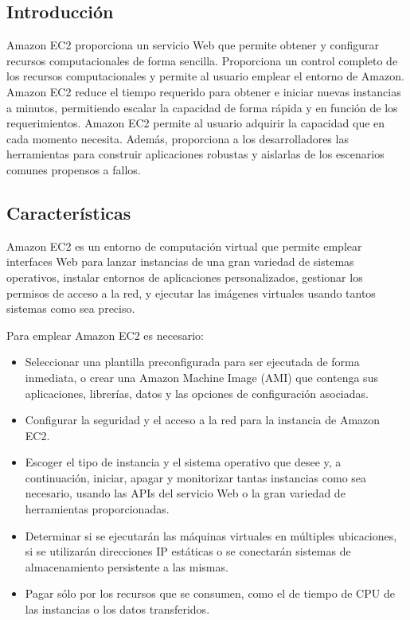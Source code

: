 \documentclass[runningheads]{llncs}
\begin{document}
\subsection{Introducción}

Amazon EC2 proporciona un servicio Web que permite obtener y configurar recursos computacionales de forma sencilla. Proporciona un 
control completo de los recursos computacionales y permite al usuario emplear el entorno de Amazon.
Amazon EC2 reduce el tiempo requerido para obtener e iniciar nuevas instancias a minutos, permitiendo escalar la capacidad de 
forma rápida y en función de los requerimientos. Amazon EC2 permite al usuario adquirir la capacidad que en cada momento necesita. 
Además, proporciona a los desarrolladores las herramientas para construir aplicaciones robustas y aislarlas de los escenarios comunes 
propensos a fallos.


\subsection{Características}

Amazon EC2 es un entorno de computación virtual que permite emplear interfaces Web para lanzar instancias de una gran variedad de 
sistemas operativos, instalar entornos de aplicaciones personalizados, gestionar los permisos de acceso a
la red, y ejecutar las imágenes virtuales usando tantos sistemas como sea preciso.

Para emplear Amazon EC2 es necesario:

\begin{itemize}
 \item Seleccionar una plantilla preconfigurada para ser ejecutada de forma inmediata, o crear una Amazon Machine Image (AMI) 
 que contenga sus aplicaciones, librerías, datos y las opciones de configuración asociadas.
 \item Configurar la seguridad y el acceso a la red para la instancia de Amazon EC2.
 \item Escoger el tipo de instancia y el sistema operativo que desee y, a continuación, iniciar, apagar y monitorizar tantas 
 instancias como sea necesario, usando las APIs del servicio Web o la gran variedad de herramientas proporcionadas.
 \item Determinar si se ejecutarán las máquinas virtuales en múltiples ubicaciones, si se utilizarán direcciones IP estáticas o se 
 conectarán sistemas de almacenamiento persistente a las mismas.
 \item Pagar sólo por los recursos que se consumen, como el de tiempo de CPU de las instancias o los datos transferidos.
 
\end{itemize}
\end{document}
